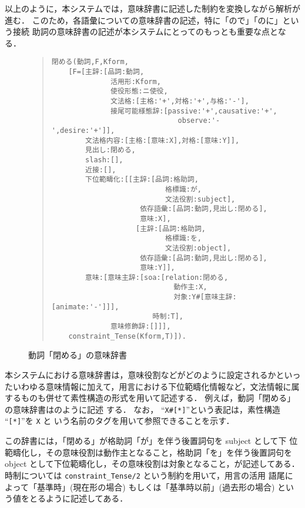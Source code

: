 以上のように，本システムでは，意味辞書に記述した制約を変換しながら解析が
進む．
このため，各語彙についての意味辞書の記述，特に「ので」「のに」という接続
助詞の意味辞書の記述が本システムにとってのもっとも重要な点となる．

\begin{figure}[htbp]
\begin{quote}
\setlength{\baselineskip}{4.2mm}
\begin{verbatim}
閉める(動詞,F,Kform,
    [F=[主辞:[品詞:動詞,
              活用形:Kform,
              使役形態:ニ使役,
              文法格:[主格:'+',対格:'+',与格:'-'],
              接尾可能様態辞:[passive:'+',causative:'+',
                              observe:'-',desire:'+']],
        文法格内容:[主格:[意味:X],対格:[意味:Y]],
        見出し:閉める,
        slash:[],
        近接:[],
        下位範疇化:[[主辞:[品詞:格助詞,
                           格標識:が,
                           文法役割:subject],
                     依存語彙:[品詞:動詞,見出し:閉める],
                     意味:X],
                    [主辞:[品詞:格助詞,
                           格標識:を,
                           文法役割:object],
                     依存語彙:[品詞:動詞,見出し:閉める],
                     意味:Y]],
        意味:[意味主辞:[soa:[relation:閉める,
                             動作主:X,
                             対象:Y#[意味主辞:[animate:'-']]],
                        時制:T],
              意味修飾辞:[]]],
    constraint_Tense(Kform,T)]).

\end{verbatim}
\end{quote}
\caption{動詞「閉める」の意味辞書}
\end{figure}

本システムにおける意味辞書は，意味役割などがどのように設定されるかといっ
たいわゆる意味情報に加えて，用言における下位範疇化情報など，文法情報に属
するものも併せて素性構造の形式を用いて記述する．
例えば，動詞「閉める」の意味辞書はのように記述
する．
なお， ``{\tt X\#[*]}''という表記は，素性構造 ``{\tt [*]}''を {\tt X} と
いう名前のタグを用いて参照できることを示す．

この辞書には，「閉める」が格助詞「が」を伴う後置詞句を subject として下
位範疇化し，その意味役割は動作主となること，格助詞「を」を伴う後置詞句を 
object として下位範疇化し，その意味役割は対象となること，が記述してある．
時制については {\tt constraint\_Tense/2} という制約を用いて，用言の活用
語尾によって「基準時」(現在形の場合) もしくは「基準時以前」(過去形の場合) 
という値をとるように記述してある．

